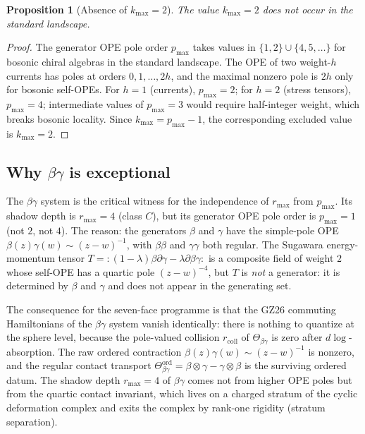 \documentclass[11pt]{article}
\theoremstyle{plain}
\newtheorem{proposition}[theorem]{Proposition}
\theoremstyle{definition}
\theoremstyle{remark}
\begin{document}
\begin{proposition}[Absence of $k_{\max}=2$]\label{prop:no-k2}
The value $k_{\max}=2$ does not occur in the standard landscape.
\end{proposition}

\begin{proof}
The generator OPE pole order $p_{\max}$ takes values in
$\{1,2\}\cup\{4,5,\ldots\}$ for bosonic chiral algebras in the
standard landscape. The OPE of two weight-$h$ currents has poles
at orders $0,1,\ldots,2h$, and the maximal nonzero pole is $2h$
only for bosonic self-OPEs. For $h=1$ (currents), $p_{\max}=2$;
for $h=2$ (stress tensors), $p_{\max}=4$; intermediate values of
$p_{\max}=3$ would require half-integer weight, which breaks
bosonic locality. Since $k_{\max}=p_{\max}-1$, the corresponding
excluded value is $k_{\max}=2$.
\end{proof}

\subsection{Why $\beta\gamma$ is exceptional}

The $\beta\gamma$ system is the critical witness for the
independence of $r_{\max}$ from $p_{\max}$. Its shadow depth is
$r_{\max}=4$ (class $C$), but its generator OPE pole order is
$p_{\max}=1$ (not $2$, not $4$). The reason: the generators
$\beta$ and $\gamma$ have the simple-pole OPE
$\beta(z)\gamma(w)\sim (z-w)^{-1}$, with $\beta\beta$ and
$\gamma\gamma$ both regular. The Sugawara energy-momentum
tensor $T = :(1-\lambda)\beta\partial\gamma - \lambda\partial\beta\gamma:$
is a composite field of weight $2$ whose self-OPE has a quartic
pole $(z-w)^{-4}$, but $T$ is \emph{not} a generator: it is
determined by $\beta$ and $\gamma$ and does not appear in the
generating set.

The consequence for the seven-face programme is that the
GZ26 commuting Hamiltonians of the $\beta\gamma$ system vanish
identically: there is nothing to quantize at the sphere level,
because the pole-valued collision \(r_{\mathrm{coll}}\) of
\(\Theta_{\beta\gamma}\) is zero after \(d\log\)-absorption. The raw
ordered contraction \(\beta(z)\gamma(w)\sim(z-w)^{-1}\) is nonzero,
and the regular contact transport
\(\Theta_{\beta\gamma}^{\mathrm{ord}}
=\beta\otimes\gamma-\gamma\otimes\beta\)
is the surviving ordered datum. The shadow depth $r_{\max}=4$ of
$\beta\gamma$ comes not
from higher OPE poles but from the quartic contact invariant,
which lives on a charged stratum of the cyclic deformation
complex and exits the complex by rank-one rigidity (stratum
separation).
\end{document}
